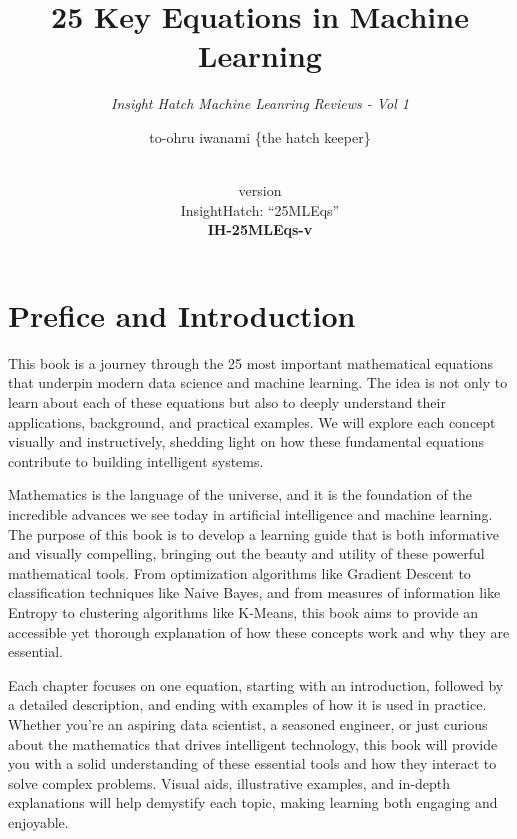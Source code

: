 \documentclass[
  12 pt,
  a4paper,
]{book}
\title{25 Key Equations in Machine Learning}
\subtitle{\textit{Insight Hatch Machine Leanring Reviews - Vol 1}}
\author{to-ohru iwanami \{the hatch keeper\}}
\date{\vhCurrentDate\\
version \vhCurrentVersion\\
InsightHatch: ``25MLEqs''\\
\textbf{IH-25MLEqs-v}\textbf{\vhCurrentVersion}}
\numberwithin{equation}{section}
\theoremstyle{plain}      %
\theoremstyle{definition} %
\theoremstyle{remark}     %
\theoremstyle{note}         %
\begin{document}
\frontmatter
\maketitle

{
\setcounter{tocdepth}{1}
\tableofcontents
}
\mainmatter
\hfill\break

\begin{versionhistory}
\end{versionhistory}
\newpage

\setcounter{table}{0}

\frontmatter

\hypertarget{prefice-and-introduction}{%
\chapter{Prefice and Introduction}\label{prefice-and-introduction}}

This book is a journey through the 25 most important mathematical
equations that underpin modern data science and machine learning. The
idea is not only to learn about each of these equations but also to
deeply understand their applications, background, and practical
examples. We will explore each concept visually and instructively,
shedding light on how these fundamental equations contribute to building
intelligent systems.

Mathematics is the language of the universe, and it is the foundation of
the incredible advances we see today in artificial intelligence and
machine learning. The purpose of this book is to develop a learning
guide that is both informative and visually compelling, bringing out the
beauty and utility of these powerful mathematical tools. From
optimization algorithms like Gradient Descent to classification
techniques like Naive Bayes, and from measures of information like
Entropy to clustering algorithms like K-Means, this book aims to provide
an accessible yet thorough explanation of how these concepts work and
why they are essential.

Each chapter focuses on one equation, starting with an introduction,
followed by a detailed description, and ending with examples of how it
is used in practice. Whether you're an aspiring data scientist, a
seasoned engineer, or just curious about the mathematics that drives
intelligent technology, this book will provide you with a solid
understanding of these essential tools and how they interact to solve
complex problems. Visual aids, illustrative examples, and in-depth
explanations will help demystify each topic, making learning both
engaging and enjoyable.
\end{document}
